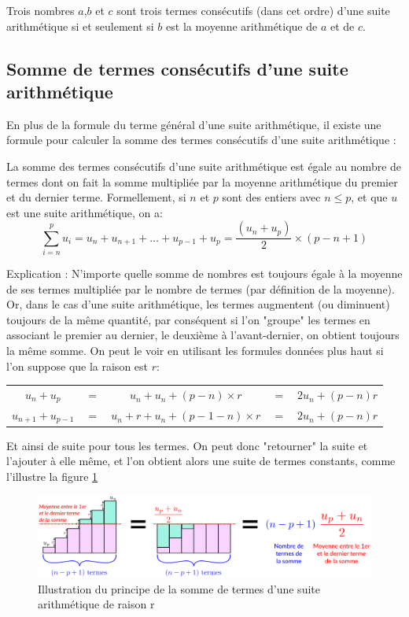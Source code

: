 \documentclass[10pt,a4paper]{book}
\begin{document}
\begin{prop}
    Trois nombres $a$,$b$ et $c$ sont trois termes consécutifs (dans cet ordre) d'une suite arithmétique si et seulement si $b$ est la moyenne arithmétique de $a$ et de $c$.
\end{prop}



\subsection{Somme de termes consécutifs d'une suite arithmétique}

En plus de la formule du terme général d'une suite arithmétique, il existe une formule pour calculer la somme des termes consécutifs d'une suite arithmétique :

\begin{prop}
    La somme des termes consécutifs d'une suite arithmétique est égale au nombre de termes dont on fait la somme multipliée par la moyenne arithmétique du premier et du dernier terme.
    Formellement, si $n$ et $p$ sont des entiers avec $n \leq p$, et que $u$ est une suite arithmétique, on a:
    \[  \sum_{i=n}^{p} u_i= u_n + u_{n+1} + \ldots  + u_{p-1} + u_p = \frac{(u_n+u_p)}{2} \times (p-n+1)
    \]
\end{prop}

Explication : N'importe quelle somme de nombres est toujours égale à la moyenne de ses termes multipliée par le nombre de termes (par définition de la moyenne). Or, dans le cas d'une suite arithmétique, les termes augmentent (ou diminuent) toujours de la même quantité, par conséquent si l'on "groupe" les termes en associant le premier au dernier, le deuxième à l'avant-dernier, on obtient toujours la même somme. On peut le voir en utilisant les formules données plus haut si l'on suppose que la raison est $r$:


\begin{tabular}{ccccc}
$u_n + u_p $&$=$ &$  u_n  +  u_n + (p-n) \times r $&$=$ & $ 2u_n + (p-n)r$ \\
$u_{n+1} + u_{p-1} $&$=$&$u_n + r  +  u_n + (p-1-n) \times r $&$=$&$2u_n + (p-n)r$
\end{tabular}

Et ainsi de suite pour tous les termes. On peut donc "retourner" la suite et l'ajouter à elle même, et l'on obtient alors une suite de termes constants, comme l'illustre la figure  \ref{fig:sumarith}

\begin{figure}[htbp]
\centering
\includegraphics[width=1.0\textwidth]{suites-arithmetiques-somme.png}
\caption{Illustration du principe de la somme de termes d'une suite arithmétique de raison r}
\label{fig:sumarith}
\end{figure}
\end{document}
